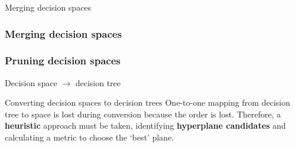 \documentclass[english]{beamer}
\begin{document}
\begin{frame}{Merging decision spaces}
	\frametitle<1>{Merging decision spaces}
	\frametitle<3>{Pruning decision spaces}
\end{frame}


\begin{frame}{Decision space $\rightarrow$ decision tree}
	\begin{block}{Converting decision spaces to decision trees}
		One-to-one mapping from decision tree to space is lost during conversion because the order is lost. Therefore, a \textbf{heuristic} approach must be taken, identifying \textbf{hyperplane candidates} and calculating a metric to choose the `best' plane.
	\end{block}
\end{frame}
\end{document}
